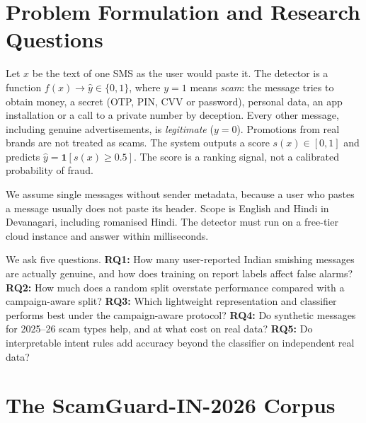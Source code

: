 \documentclass[conference]{IEEEtran}
\begin{document}
\section{Problem Formulation and Research Questions}
\label{sec:problem}

Let $x$ be the text of one SMS as the user would paste it. The detector is a function $f(x)\rightarrow \hat{y}\in\{0,1\}$, where $y=1$ means \emph{scam}: the message tries to obtain money, a secret (OTP, PIN, CVV or password), personal data, an app installation or a call to a private number by deception. Every other message, including genuine advertisements, is \emph{legitimate} ($y=0$). Promotions from real brands are not treated as scams. The system outputs a score $s(x)\in[0,1]$ and predicts $\hat{y}=\mathbf{1}[s(x)\ge 0.5]$. The score is a ranking signal, not a calibrated probability of fraud.

We assume single messages without sender metadata, because a user who pastes a message usually does not paste its header. Scope is English and Hindi in Devanagari, including romanised Hindi. The detector must run on a free-tier cloud instance and answer within milliseconds.

We ask five questions.
\textbf{RQ1:} How many user-reported Indian smishing messages are actually genuine, and how does training on report labels affect false alarms?
\textbf{RQ2:} How much does a random split overstate performance compared with a campaign-aware split?
\textbf{RQ3:} Which lightweight representation and classifier performs best under the campaign-aware protocol?
\textbf{RQ4:} Do synthetic messages for 2025--26 scam types help, and at what cost on real data?
\textbf{RQ5:} Do interpretable intent rules add accuracy beyond the classifier on independent real data?

\section{The ScamGuard-IN-2026 Corpus}
\label{sec:data}
\end{document}
